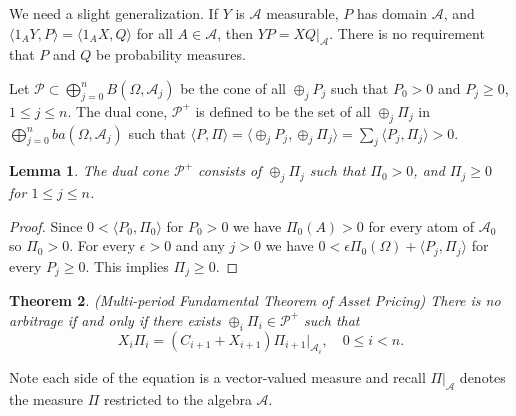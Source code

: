 \documentclass[fleqn]{amsart}
\renewcommand{\AA}{\mathcal{A}}
\newcommand{\BB}{\mathcal{B}}
\newcommand{\PP}{\mathcal{P}}
\providecommand{\pair}[1]{\langle#1\rangle}
\newtheorem{theorem}{Theorem}[section]
\newtheorem{lemma}[theorem]{Lemma}
\begin{document}
We need a slight generalization. If \(Y\) is
\(\AA\) measurable, \(P\) has domain \(\AA\), and
\(\pair{1_AY,P} = \pair{1_AX,Q}\) for all \(A\in\AA\),
then \(YP = XQ|_\AA\). There is no requirement that
\(P\) and \(Q\) be probability measures.

Let $\PP\subset\bigoplus_{j=0}^n B(\Omega, \AA_j)$ be the cone of all
$\oplus_j P_j$ such that $P_0 > 0$ and $P_j \ge 0$, $1\le j\le n$.
The dual cone, $\PP^+$ is defined to be the set of all 
$\oplus_j \Pi_j$ in
$\bigoplus_{j=0}^n ba(\Omega, \AA_j)$ such that
$\langle P,\Pi\rangle = \langle \oplus_j P_j, \oplus_j \Pi_j\rangle
= \sum_j\langle P_j,\Pi_j\rangle > 0$.

\begin{lemma}
The dual cone $\PP^+$ consists of $\oplus_j\Pi_j$ such that $\Pi_0 > 0$,
and $\Pi_j\ge 0$ for $1\le j\le n$.
\end{lemma}
\begin{proof}
Since $0 < \pair{P_0,\Pi_0}$ for $P_0 > 0$ we have $\Pi_0(A) > 0$
for every atom of $\AA_0$ so $\Pi_0 > 0$.  For every $\epsilon > 0$
and any $j > 0$ we have $0 < \epsilon \Pi_0(\Omega) + \pair{P_j,\Pi_j}$
for every $P_j \ge 0$.  This implies $\Pi_j \ge 0$. 
\end{proof}


\begin{theorem}{(Multi-period Fundamental Theorem of Asset Pricing)}
There is no arbitrage if and only if there exists $\oplus_i\Pi_i\in\PP^+$
such that
\[X_i \Pi_i = (C_{i + 1} + X_{i + 1})\Pi_{i + 1}|_{\AA_i},\quad 0\le i < n.\]
\end{theorem}

Note each side of the equation is a vector-valued measure and
recall \(\Pi|_\AA\) denotes the measure \(\Pi\) restricted to
the algebra \(\AA\).
\end{document}
